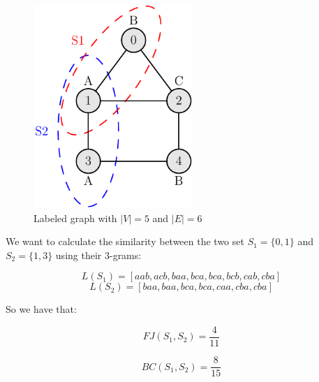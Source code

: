 \begin{esempio}
	
	\begin{figure}[h]
		\centering
		\begin{minipage}[t]{.45\textwidth}
			\centering
			\includegraphics[width=6cm,height=7.7cm]{figure/figure-2-1}
			\caption{Labeled graph with $|V| = 5$ and $|E| = 6$}
		\end{minipage}\hfill
	\end{figure}

	We want to calculate the similarity between the two set $S_{1} = \{0,1\}$ and $S_{2} = \{1, 3\}$ using their $3$-grams:
	
	\begin{equation*}
		L(S_{1}) = [aab, acb, baa, bca, bca, bcb, cab, cba]
	\end{equation*}
	\begin{equation*}
		L(S_{2}) = [baa, baa, bca, bca, caa, cba, cba]
	\end{equation*}
	
	
	
	
	So we have that:
	
	\begin{equation*}
		FJ(S_{1}, S_{2}) = \frac{4}{11}
	\end{equation*}
	
	\begin{equation*}
		BC(S_{1}, S_{2}) = \frac{8}{15}
	\end{equation*}
	
\end{esempio}

